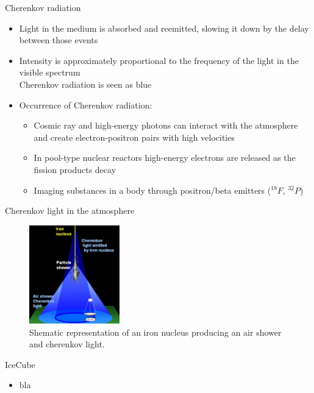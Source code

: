 \documentclass[aspectratio=1610, 10pt]{beamer}
\begin{document}
\begin{frame}{Cherenkov radiation}
  \begin{itemize}
    \item Light in the medium is absorbed and reemitted, slowing it down by the delay between those events
    \medskip
    \item Intensity is approximately proportional to the frequency of the light in the visible spectrum \\
    \rightarrow Cherenkov radiation is seen as blue
    \medskip
    \item Occurrence of Cherenkov radiation:
      \begin{itemize}
        \item Cosmic ray and high-energy photons can interact with the atmosphere and create electron-positron pairs with high velocities
        \medskip
        \item In pool-type nuclear reactors high-energy electrons are released as the fission products decay
        \medskip
        \item Imaging substances in a body through positron/beta emitters ($^{18}F$, $^{32}P$)
      \end{itemize}
  \end{itemize}
\end{frame}


\begin{frame}{Cherenkov light in the atmosphere}
  \begin{figure}
    \includegraphics[width=0.35\textwidth]{images/cherenkov_cone.png}
    \caption{Shematic representation of an iron nucleus producing an air shower and cherenkov light.}
  \end{figure}
\end{frame}
\begin{frame}{IceCube}
  \begin{itemize}
    \item bla
  \end{itemize}
\end{frame}
\end{document}

